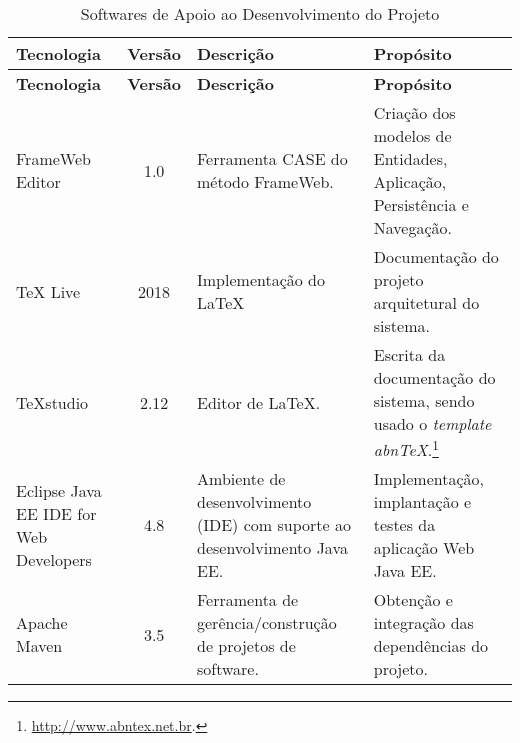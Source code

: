 \begin{footnotesize}
\begin{longtable}{|p{2.5cm}|c|p{5cm}|p{5.5cm}|}
	\caption{Softwares de Apoio ao Desenvolvimento do Projeto}	
	\label{tabela-software}\\\hline
	
	\rowcolor{lightgray}
	\textbf{Tecnologia} & \textbf{Versão} & \textbf{Descrição} & \textbf{Propósito} \\\hline 
	\endfirsthead
	\hline
	\rowcolor{lightgray}
	\textbf{Tecnologia} & \textbf{Versão} & \textbf{Descrição} & \textbf{Propósito} \\\hline 
	\endhead
	 
	FrameWeb Editor & 1.0 & Ferramenta CASE do método FrameWeb. & Criação dos modelos de Entidades, Aplicação, Persistência e Navegação. \\\hline

	TeX Live  & 2018 & Implementação do \LaTeX & Documentação do projeto arquitetural do sistema. \\\hline       
	
	TeXstudio & 2.12 & Editor de LaTeX. &  Escrita da documentação do sistema, sendo usado o \textit{template} \textit{abnTeX}.\footnote{\url{http://www.abntex.net.br}.} \\\hline    

	Eclipse Java EE IDE for Web Developers & 4.8 & Ambiente de desenvolvimento (IDE) com suporte ao desenvolvimento Java EE. & Implementação, implantação e testes da aplicação Web Java EE. \\\hline 
	
	Apache Maven & 3.5 & Ferramenta de gerência/construção de projetos de software. & Obtenção e integração das dependências do projeto. \\\hline
\end{longtable}
\end{footnotesize}
